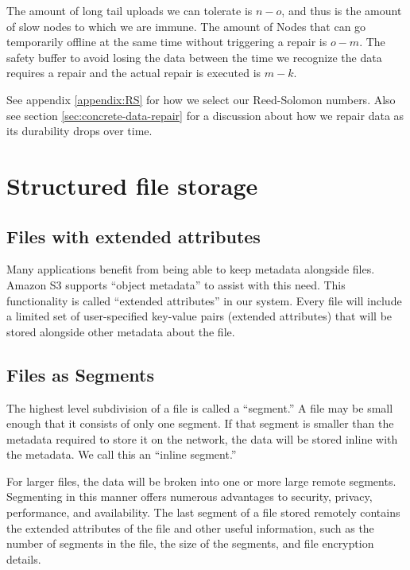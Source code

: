\documentclass[8pt,fleqn,openany]{book}
\begin{document}
The amount of long tail uploads we can tolerate is $n-o$, and thus is the amount
of slow nodes to which we are immune.  The amount of Nodes that can go
temporarily offline at the same time without triggering a repair is $o-m$. The
safety buffer to avoid losing the data between the time we recognize the data
requires a repair and the actual repair is executed is $m-k$.

See appendix \ref{appendix:RS} for how we select our Reed-Solomon numbers.
Also see section \ref{sec:concrete-data-repair} for a discussion about
how we repair data as its durability drops over time.

\section{Structured file storage}\label{sec:structured-file-storage}

\subsection{Files with extended attributes}

Many applications benefit from being able to keep metadata alongside files.
Amazon S3 supports ``object metadata'' \cite{s3-object-meta} to assist with this
need. This functionality is called ``extended attributes'' in our system.
Every file will include a limited set of user-specified key-value pairs
(extended attributes) that will be stored alongside other metadata about the
file.

\subsection{Files as Segments}

The highest level subdivision of a file is called a ``segment.''
A file may be small enough that it consists of only one segment.
If that segment is smaller than the metadata required to store it on the
network, the data will be stored inline with the metadata. We call this an
``inline segment.''

For larger files, the data will be broken
into one or more large remote segments. Segmenting in this manner offers
numerous advantages to security, privacy, performance, and availability. The
last segment of a file stored remotely contains the extended attributes of
the file and other useful information, such as the number of segments in the
file, the size of the segments, and file encryption details.
\end{document}
